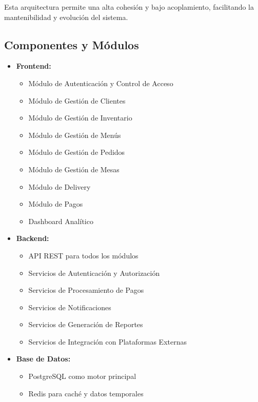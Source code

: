 \documentclass[12pt]{article}
\begin{document}
Esta arquitectura permite una alta cohesión y bajo acoplamiento, facilitando la mantenibilidad y evolución del sistema.

\subsection{Componentes y Módulos}
\begin{itemize}
  \item \textbf{Frontend:}
  \begin{itemize}
    \item Módulo de Autenticación y Control de Acceso
    \item Módulo de Gestión de Clientes
    \item Módulo de Gestión de Inventario
    \item Módulo de Gestión de Menús
    \item Módulo de Gestión de Pedidos
    \item Módulo de Gestión de Mesas
    \item Módulo de Delivery
    \item Módulo de Pagos
    \item Dashboard Analítico
  \end{itemize}
  
  \item \textbf{Backend:}
  \begin{itemize}
    \item API REST para todos los módulos
    \item Servicios de Autenticación y Autorización
    \item Servicios de Procesamiento de Pagos
    \item Servicios de Notificaciones
    \item Servicios de Generación de Reportes
    \item Servicios de Integración con Plataformas Externas
  \end{itemize}
  
  \item \textbf{Base de Datos:}
  \begin{itemize}
    \item PostgreSQL como motor principal
    \item Redis para caché y datos temporales
  \end{itemize}
\end{itemize}
\end{document}

